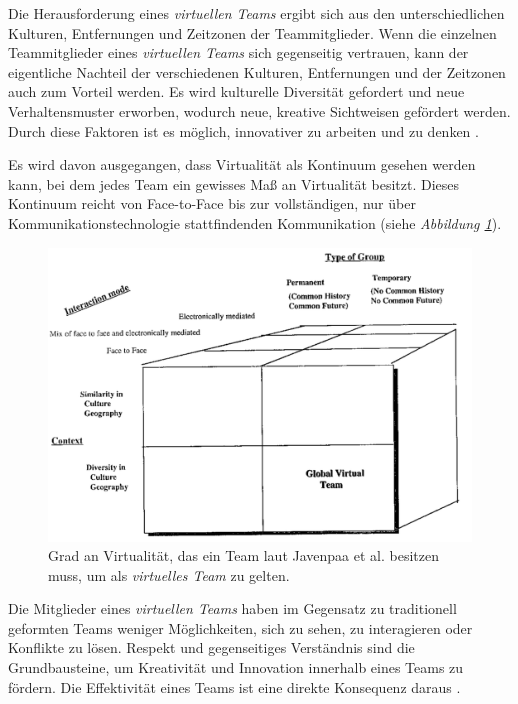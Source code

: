 \documentclass[sigchi]{acmart}
\begin{document}
Die Herausforderung eines \textit{virtuellen Teams} ergibt sich aus den unterschiedlichen Kulturen, Entfernungen und Zeitzonen der Teammitglieder. Wenn die einzelnen Teammitglieder eines \textit{virtuellen Teams} sich gegenseitig vertrauen, kann der eigentliche Nachteil der verschiedenen Kulturen, Entfernungen und der Zeitzonen auch zum Vorteil werden. Es wird kulturelle Diversität gefordert und neue Verhaltensmuster erworben, wodurch neue, kreative Sichtweisen gefördert werden. Durch diese Faktoren ist es möglich, innovativer zu arbeiten und zu denken \citep{dyer1995team} \citep[S. 405-416]{milliken1996searching}.

Es wird davon ausgegangen, dass Virtualität als Kontinuum gesehen werden kann, bei dem jedes Team ein gewisses Maß an Virtualität besitzt. Dieses Kontinuum reicht von Face-to-Face bis zur vollständigen, nur über Kommunikationstechnologie stattfindenden Kommunikation \citep{martins2004virtual} (siehe \textit{Abbildung \ref{virtualTeamsVirtuality}}).

\begin{figure}[H]
		\begin{footnotesize}
		\centering
			\includegraphics[width=\linewidth]{Abbildungen/GlobalVirtualTeam.PNG}	
			\caption[Virtualität eines virtuellen Teams]{Grad an Virtualität, das ein Team laut Javenpaa et al. \citep{jarvenpaa1999communication} besitzen muss, um als \textit{virtuelles Team} zu gelten.}
			\label{virtualTeamsVirtuality}
		\end{footnotesize}
	\end{figure}

Die Mitglieder eines \textit{virtuellen Teams} haben im Gegensatz zu traditionell geformten Teams weniger Möglichkeiten, sich zu sehen, zu interagieren oder Konflikte zu lösen. 
Respekt und gegenseitiges Verständnis sind die Grundbausteine, um Kreativität und Innovation innerhalb eines Teams zu fördern. Die Effektivität eines Teams ist eine direkte Konsequenz daraus \citep[S. 378]{ren2007applying}.
\end{document}
